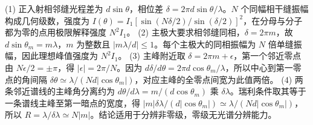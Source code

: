 (1) 正入射相邻缝光程差为 \(d\sin\theta\)，相位差 \(\delta=2\pi d\sin\theta/\lambda\)。\(N\) 个同幅相干缝振幅构成几何级数，强度为 \(I(\theta)=I_1[\sin(N\delta/2)/\sin(\delta/2)]^2\)，在分母与分子都为零的点用极限解释强度 \(N^2I_1\)。
(2) 主极大要求相邻缝同相，\(\delta=2\pi m\)，故 \(d\sin\theta_m=m\lambda\)，\(m\) 为整数且 \(|m\lambda/d|\le1\)。每个主极大的同相振幅为 \(N\) 倍单缝振幅，因此理想峰值强度为 \(N^2I_1\)。
(3) 主峰附近取 \(\delta=2\pi m+\epsilon\)，第一个邻近零点由 \(N\epsilon/2=\pm\pi\)，得 \(|\epsilon|=2\pi/N\)。因为 \(d\delta/d\theta=2\pi d\cos\theta_m/\lambda\)，所以中心到第一零点的角间隔 \(\delta\theta\simeq\lambda/(Nd|\cos\theta_m|)\)，对应主峰的全零点间宽为此值两倍。
(4) 两条邻近谱线的主峰角分离约为 \(d\theta/d\lambda=m/(d\cos\theta_m)\) 乘 \(\delta\lambda\)。瑞利条件取其等于一条谱线主峰至第一暗点的宽度，得 \(|m|\delta\lambda/(d|\cos\theta_m|)\simeq\lambda/(Nd|\cos\theta_m|)\)，所以 \(R=\lambda/\delta\lambda\simeq N|m|\)。结论适用于分辨非零级，零级无光谱分辨能力。
